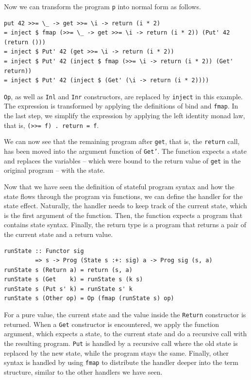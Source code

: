 \documentclass[a4paper, 11pt, fleqn, twoside, abstract=on]{scrreprt}
\newcommand{\hinl}[1]{\texttt{#1}}
\begin{document}
Now we can transform the program \hinl{p} into normal form as follows.

\begin{verbatim}
put 42 >>= \_ -> get >>= \i -> return (i * 2)
= inject $ fmap (>>= \_ -> get >>= \i -> return (i * 2)) (Put' 42 (return ()))
= inject $ Put' 42 (get >>= \i -> return (i * 2))
= inject $ Put' 42 (inject $ fmap (>>= \i -> return (i * 2)) (Get' return))
= inject $ Put' 42 (inject $ (Get' (\i -> return (i * 2))))
\end{verbatim}

\hinl{Op}, as well as \hinl{Inl} and \hinl{Inr} constructors, are replaced by \hinl{inject} in this example.
The expression is transformed by applying the definitions of bind and \hinl{fmap}.
In the last step, we simplify the expression by applying the left identity monad law, that is, \hinl{(>>= f) . return = f}.

We can now see that the remaining program after \hinl{get}, that is, the \hinl{return} call, has been moved into the argument function of \hinl{Get'}.
The function expects a state and replaces the variables -- which were bound to the return value of \hinl{get} in the original program -- with the state.

Now that we have seen the definition of stateful program syntax and how the state flows through the program via functions, we can define the handler for the state effect.
Naturally, the handler needs to keep track of the current state, which is the first argument of the function.
Then, the function expects a program that contains state syntax.
Finally, the return type is a program that returns a pair of the current state and a return value.

\begin{verbatim}
runState :: Functor sig 
         => s -> Prog (State s :+: sig) a -> Prog sig (s, a)
runState s (Return a) = return (s, a)
runState s (Get    k) = runState s (k s)
runState s (Put s' k) = runState s' k
runState s (Other op) = Op (fmap (runState s) op)
\end{verbatim}

For a pure value, the current state and the value inside the \hinl{Return} constructor is returned.
When a \hinl{Get} constructor is encountered, we apply the function argument, which expects a state, to the current state and do a recursive call with the resulting program.
\hinl{Put} is handled by a recursive call where the old state is replaced by the new state, while the program stays the same.
Finally, other syntax is handled by using \hinl{fmap} to distribute the handler deeper into the term structure, similar to the other handlers we have seen.
\end{document}

